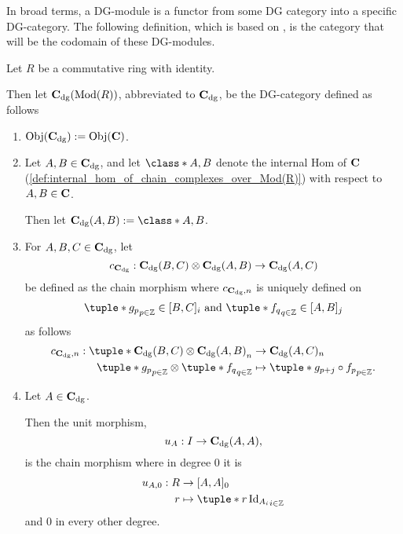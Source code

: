 In broad terms, a DG-module is a functor from some DG category into a specific DG-category. The following definition, which is based on \cite[p.\ 29]{Jasso-Muro_2023}, is the category that will be the codomain of these DG-modules.

\begin{definition}[\( \C_{\dg} \)]
    \label{def:c_dg_mod_r}
    Let \( R \) be a commutative ring with identity.

    Then let \emph{\( \operatorname{\mathbf{C}}_{\operatorname{dg}}(\operatorname{Mod}(R)) \)}, abbreviated to \emph{\( \C_{\dg} \)}, be the DG-category defined as follows
    \begin{enumerate}
        \item {
            \( \operatorname{Obj}(\operatorname{\mathbf{C}}_{\operatorname{dg}}) := \operatorname{Obj}(\operatorname{\mathbf{C}}) \).
        }
        \item {
            Let \( A, B \in \operatorname{\mathbf{C}}_{\operatorname{dg}} \), and let \( \class*{A, B} \) denote the internal Hom of \( \operatorname{\mathbf{C}} \) (\autoref{def:internal_hom_of_chain_complexes_over_Mod(R)}) with respect to \( A, B \in \operatorname{\mathbf{C}} \).

            Then let \( \C_{\dg}(A, B) := \class*{A, B} \).
        }
        \item {
            For \( A, B, C \in \operatorname{\mathbf{C}}_{\operatorname{dg}} \), let
            \[
                c_{\operatorname{\mathbf{C}}_{\operatorname{dg}}}: \operatorname{\mathbf{C}}_{\operatorname{dg}}(B, C) \otimes \operatorname{\mathbf{C}}_{\operatorname{dg}}(A, B) \to \operatorname{\mathbf{C}}_{\operatorname{dg}}(A, C)
            \]
            be defined as the chain morphism where \( c_{\operatorname{\mathbf{C}}_{\operatorname{dg}}, n} \) is uniquely defined on
            \[
                \tuple*{g_p}_{p \in \Zb} \in [B, C]_i \text{ and } \tuple*{f_q}_{q \in \Zb} \in [A, B]_j
            \]
            as follows
            \begin{align*}
                c_{\C_{\dg}, n}: \tuple*{ \C_{\dg}(B, C) \otimes \C_{\dg}(A, B) }_n &\to \C_{\dg}(A, C)_n \\
                \tuple*{g_p}_{p \in \Zb} \otimes \tuple*{f_q}_{q \in \Zb} &\mapsto \tuple*{g_{p + j} \circ f_p}_{p \in \Zb}.
            \end{align*}
        }
        \item {
            Let \( A \in \operatorname{\mathbf{C}}_{\operatorname{dg}} \).

            Then the unit morphism,
            \[
                u_A: I \to \operatorname{\mathbf{C}}_{\operatorname{dg}}(A, A),
            \]
            is the chain morphism where in degree \( 0 \) it is
            \begin{align*}
                u_{A, 0} : R &\to [A, A]_0 \\
                r &\mapsto \tuple*{r\Id_{A_i}}_{i \in \Zb}
            \end{align*}
            and \( 0 \) in every other degree.
        }
    \end{enumerate}
\end{definition}

